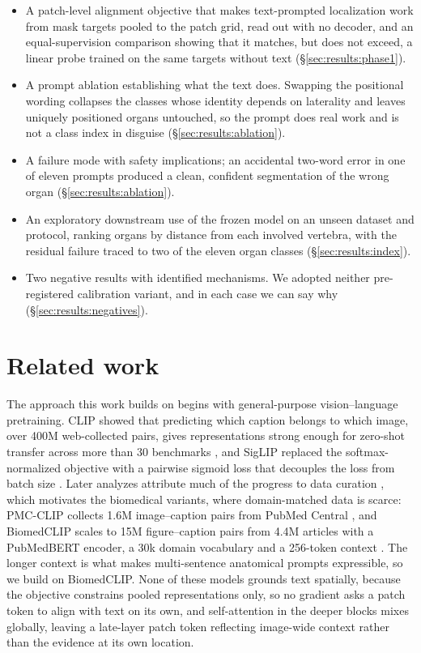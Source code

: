 \documentclass[10pt]{article}
\begin{document}
\begin{itemize}[leftmargin=1.3em,itemsep=1pt,topsep=2pt]
\item A patch-level alignment objective that makes text-prompted localization
work from mask targets pooled to the patch grid, read out with no decoder, and an
equal-supervision comparison showing that it matches, but does not exceed, a
linear probe trained on the same targets without text
(\S\ref{sec:results:phase1}).
\item A prompt ablation establishing what the text does. Swapping the positional
wording collapses the classes whose identity depends on laterality and leaves
uniquely positioned organs untouched, so the prompt does real work and is not a
class index in disguise (\S\ref{sec:results:ablation}).
\item A failure mode with safety implications; an accidental two-word error in one
of eleven prompts produced a clean, confident segmentation of the wrong organ
(\S\ref{sec:results:ablation}).
\item An exploratory downstream use of the frozen model on an unseen dataset and
protocol, ranking organs by distance from each involved vertebra, with the
residual failure traced to two of the eleven organ classes
(\S\ref{sec:results:index}).
\item Two negative results with identified mechanisms. We adopted neither
pre-registered calibration variant, and in each case we can say why
(\S\ref{sec:results:negatives}).
\end{itemize}

\section{Related work}
\label{sec:related}

The approach this work builds on begins with general-purpose vision--language
pretraining. CLIP showed that predicting which caption belongs to which image, over 400M
web-collected pairs, gives representations strong enough for zero-shot transfer
across more than 30 benchmarks \cite{radford2021clip}, and SigLIP replaced the
softmax-normalized objective with a pairwise sigmoid loss that decouples the loss
from batch size \cite{zhai2023siglip}. Later analyzes attribute much of the
progress to data curation \cite{xu2024metaclip, gadre2023datacomp}, which
motivates the biomedical variants, where domain-matched data is scarce: PMC-CLIP
collects 1.6M image--caption pairs from PubMed Central \cite{lin2023pmcclip}, and
BiomedCLIP scales to 15M figure--caption pairs from 4.4M articles with a
PubMedBERT encoder, a 30k domain vocabulary and a 256-token context
\cite{zhang2025biomedclip}. The longer context is what makes multi-sentence
anatomical prompts expressible, so we build on BiomedCLIP. None of these models
grounds text spatially, because the objective constrains pooled representations
only, so no gradient asks a patch token to align with text on its own, and
self-attention in the deeper blocks mixes globally, leaving a late-layer patch
token reflecting image-wide context rather than the evidence at its own location.
\end{document}
